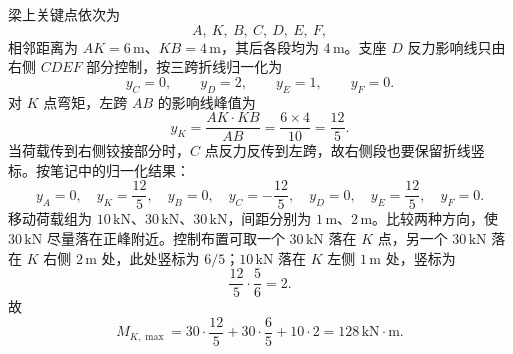 \begin{solutioncard}

梁上关键点依次为
\[
 A,\ K,\ B,\ C,\ D,\ E,\ F,
\]
相邻距离为 \(AK=6\,\mathrm{m}\)、\(KB=4\,\mathrm{m}\)，其后各段均为 \(4\,\mathrm{m}\)。支座 \(D\) 反力影响线只由右侧 \(CDEF\) 部分控制，按三跨折线归一化为
\[
  y_C=0,\qquad y_D=2,\qquad y_E=1,\qquad y_F=0.
\]
对 \(K\) 点弯矩，左跨 \(AB\) 的影响线峰值为
\[
  y_K=\frac{AK\cdot KB}{AB}
  =\frac{6\times4}{10}
  =\frac{12}{5}.
\]
当荷载传到右侧铰接部分时，\(C\) 点反力反传到左跨，故右侧段也要保留折线竖标。按笔记中的归一化结果：
\[
  y_A=0,\quad y_K=\frac{12}{5},\quad y_B=0,\quad
  y_C=-\frac{12}{5},\quad y_D=0,\quad y_E=\frac{12}{5},\quad y_F=0.
\]
移动荷载组为 \(10\,\mathrm{kN}\)、\(30\,\mathrm{kN}\)、\(30\,\mathrm{kN}\)，间距分别为 \(1\,\mathrm{m}\)、\(2\,\mathrm{m}\)。比较两种方向，使 \(30\,\mathrm{kN}\) 尽量落在正峰附近。控制布置可取一个 \(30\,\mathrm{kN}\) 落在 \(K\) 点，另一个 \(30\,\mathrm{kN}\) 落在 \(K\) 右侧 \(2\,\mathrm{m}\) 处，此处竖标为 \(6/5\)；\(10\,\mathrm{kN}\) 落在 \(K\) 左侧 \(1\,\mathrm{m}\) 处，竖标为
\[
  \frac{12}{5}\cdot\frac56=2.
\]
故
\[
  M_{K,\max}
  =30\cdot\frac{12}{5}
   +30\cdot\frac65
   +10\cdot2
  =128\,\mathrm{kN\cdot m}.
\]
\begin{figure}[H]
\centering
{}
\end{figure}
\end{solutioncard}
